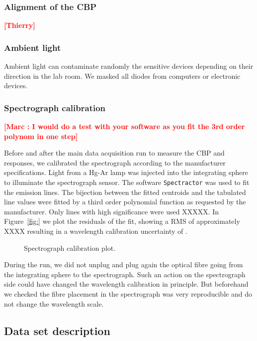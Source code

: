 \documentclass[printer]{aa}
\newcommand{\todo}[1]{\textbf{\textcolor{red}{[#1]}}\xspace}
\begin{document}
\subsubsection{Alignment of the CBP}

\todo{Thierry}


\subsubsection{Ambient light}

Ambient light can contaminate randomly the sensitive devices depending on their direction in the lab room. We masked all diodes from computers or electronic devices.

\subsubsection{Spectrograph calibration}

\todo{Marc : I would do a test with your software as you fit the 3rd order polynom in one step}

Before and after the main data acquisition run to measure the CBP and \SD responses, we calibrated the spectrograph according to the manufacturer specifications. Light from a Hg-Ar lamp was injected into the integrating sphere to illuminate the spectrograph sensor. The software \texttt{Spectractor} was used to fit the emission lines. The bijection between the fitted centroids and the tabulated line values were fitted by a third order polynomial function as requested by the manufacturer. Only lines with high significance were used XXXXX. In Figure~\ref{fig:} we plot the residuals of the fit, showing a RMS of approximately XXXX resulting in a wavelength calibration uncertainty of .



\begin{figure}[!h]
\centering
\caption{Spectrograph calibration plot.}
\end{figure}


During the run, we did not unplug and plug again the optical fibre going from the integrating sphere to the spectrograph. Such an action on the spectrograph side could have changed the wavelength calibration in principle. But beforehand we checked the fibre placement in the spectrograph was very reproducible and do not change the wavelength scale.
 

\subsection{Data set description}
\end{document}
